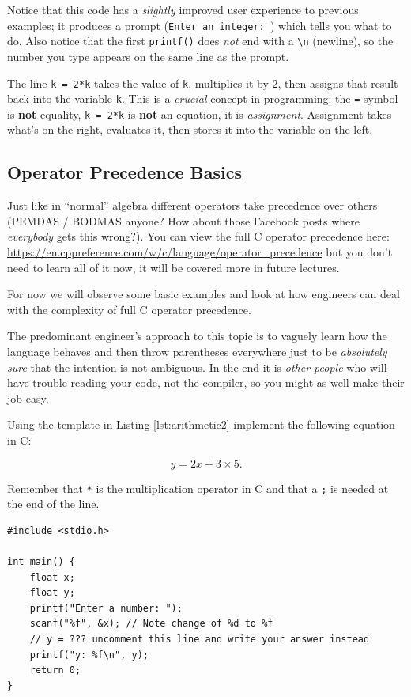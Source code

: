 \documentclass{lab}
\begin{document}
Notice that this code has a \textit{slightly} improved user experience to previous examples; it produces a prompt (\texttt{Enter an integer: }) which tells you what to do. Also notice that the first \texttt{printf()} does \textit{not} end with a \texttt{\textbackslash n} (newline), so the number you type appears on the same line as the prompt.

The line \texttt{k = 2*k} takes the value of \texttt{k}, multiplies it by 2, then assigns that result back into the variable \texttt{k}. This is a \textit{crucial} concept in programming: the \texttt{=} symbol is \textbf{not} equality, \texttt{k = 2*k} is \textbf{not} an equation, it is \textit{assignment}. Assignment takes what's on the right, evaluates it, then stores it into the variable on the left.

\subsection{Operator Precedence Basics}

Just like in ``normal'' algebra different operators take precedence over others (PEMDAS / BODMAS anyone? How about those Facebook posts where \textit{everybody} gets this wrong?). You can view the full C operator precedence here: \url{https://en.cppreference.com/w/c/language/operator_precedence} but you don't need to learn all of it now, it will be covered more in future lectures.

For now we will observe some basic examples and look at how engineers can deal with the complexity of full C operator precedence.

The predominant engineer's approach to this topic is to vaguely learn how the language behaves and then throw parentheses everywhere just to be \textit{absolutely sure} that the intention is not ambiguous. In the end it is \textit{other people} who will have trouble reading your code, not the compiler, so you might as well make their job easy.

\begin{task}{}{}
Using the template in Listing \ref{lst:arithmetic2} implement the following equation in C:

\begin{equation}\label{eq:fraction}
y = 2x+3\times5.
\end{equation}

Remember that \texttt{*} is the multiplication operator in C and that a \texttt{;} is needed at the end of the line.


\begin{lstlisting}[style=CStyle,caption=A basic arithmetic example,label=lst:arithmetic2]
#include <stdio.h>

int main() {
	float x;
	float y;
	printf("Enter a number: ");
	scanf("%f", &x); // Note change of %d to %f
	// y = ??? uncomment this line and write your answer instead
	printf("y: %f\n", y);
	return 0;
}
\end{lstlisting}
\end{task}
\end{document}
